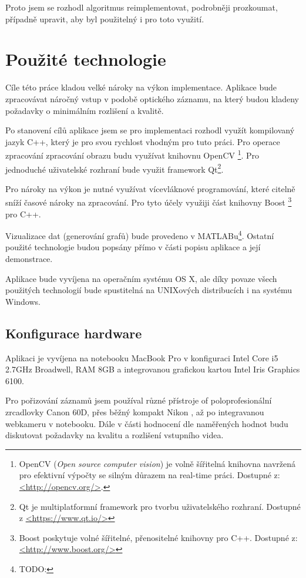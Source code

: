 \documentclass[
  digital, %
  table,   %
%
  lof,     %
  lot,     %
]{fithesis3}
\begin{document}
Proto jsem se rozhodl algoritmus reimplementovat, podrobněji prozkoumat, případně upravit, aby byl použitelný i pro toto využití.

\chapter{Použité technologie}
Cíle této práce kladou velké nároky na výkon implementace. Aplikace bude zpracovávat náročný vstup v podobě optického záznamu, na který budou kladeny požadavky o minimálním rozlišení a kvalitě.

Po stanovení cílů aplikace jsem se pro implementaci rozhodl využít kompilovaný jazyk C++, který je pro svou rychlost vhodným pro tuto práci. Pro operace zpracování zpracování obrazu budu využívat knihovnu OpenCV
\footnote{OpenCV (\emph{Open source computer vision}) je volně šířitelná knihovna navržená pro efektivní výpočty se silným důrazem na real-time práci. Dostupné z: \url{<http://opencv.org/>}.}.
Pro jednoduché uživatelské rozhraní bude využit framework Qt\footnote{Qt je multiplatformní framework pro tvorbu uživatelského rozhraní. Dostupné z \url{<https://www.qt.io/>}}.

Pro nároky na výkon je nutné využívat vícevláknové programování, které citelně sníží časové nároky na zpracování. Pro tyto účely využiji část knihovny Boost
\footnote{Boost poskytuje volné šířitelné, přenositelné knihovny pro C++. Dostupné z: \url{<http://www.boost.org/>}}
pro C++.

Vizualizace dat (generování grafů) bude provedeno v MATLABu\footnote{TODO:}. Ostatní použité technologie budou popsány přímo v části popisu aplikace a její demonstrace.

Aplikace bude vyvíjena na operačním systému OS X, ale díky povaze všech použitých technologií bude spustitelná na UNIXových distribucích i na systému Windows.

\section{Konfigurace hardware}
Aplikaci je vyvíjena na notebooku MacBook Pro v konfiguraci Intel Core i5 2.7GHz Broadwell, RAM 8GB a integrovanou grafickou kartou Intel Iris Graphics 6100.

Pro pořizování záznamů jsem používal různé přístroje of poloprofesionální zrcadlovky Canon 60D, přes běžný kompakt Nikon
, až po integravanou webkameru v notebooku. Dále v části hodnocení dle naměřených hodnot budu diskutovat požadavky na kvalitu a rozlišení vstupního videa.
\end{document}
